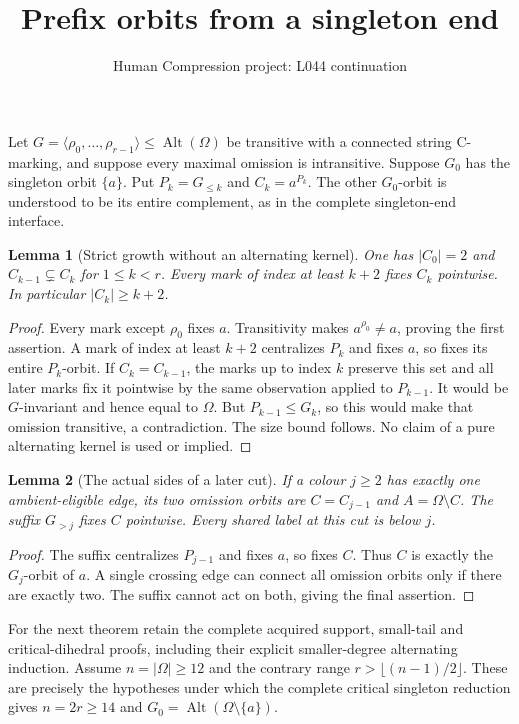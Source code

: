\documentclass[11pt,a4paper]{article}
\title{Prefix orbits from a singleton end}
\author{Human Compression project: L044 continuation}
\date{}
\newtheorem{lemma}{Lemma}
\newcommand{\gen}[1]{\langle#1\rangle}
\begin{document}
\maketitle
Let $G=\gen{\rho_0,\ldots,\rho_{r-1}}\le\operatorname{Alt}(\Omega)$
be transitive with a connected string C-marking, and suppose every
maximal omission is intransitive. Suppose $G_0$ has the singleton
orbit $\{a\}$. Put $P_k=G_{\le k}$ and $C_k=a^{P_k}$.
The other $G_0$-orbit is understood to be its entire complement,
as in the complete singleton-end interface.

\begin{lemma}[Strict growth without an alternating kernel]\label{growth}
One has $|C_0|=2$ and $C_{k-1}\subsetneq C_k$ for
$1\le k<r$. Every mark of index at least $k+2$ fixes
$C_k$ pointwise. In particular $|C_k|\ge k+2$.
\end{lemma}
\begin{proof}
Every mark except $\rho_0$ fixes $a$. Transitivity makes
$a^{\rho_0}\ne a$, proving the first assertion. A mark of
index at least $k+2$ centralizes $P_k$ and fixes $a$,
so fixes its entire $P_k$-orbit. If $C_k=C_{k-1}$,
the marks up to index $k$ preserve this set and all later
marks fix it pointwise by the same observation applied to
$P_{k-1}$. It would be $G$-invariant and hence equal to
$\Omega$. But $P_{k-1}\le G_k$, so this would make that
omission transitive, a contradiction. The size bound follows.
No claim of a pure alternating kernel is used or implied.
\end{proof}

\begin{lemma}[The actual sides of a later cut]\label{sides}
If a colour $j\ge2$ has exactly one ambient-eligible edge,
its two omission orbits are $C=C_{j-1}$ and
$A=\Omega\setminus C$. The suffix $G_{>j}$ fixes $C$
pointwise. Every shared label at this cut is below $j$.
\end{lemma}
\begin{proof}
The suffix centralizes $P_{j-1}$ and fixes $a$, so fixes
$C$. Thus $C$ is exactly the $G_j$-orbit of $a$.
A single crossing edge can connect all omission orbits only
if there are exactly two. The suffix cannot act on both,
giving the final assertion.
\end{proof}

For the next theorem retain the complete acquired support,
small-tail and critical-dihedral proofs, including their explicit
smaller-degree alternating induction. Assume $n=|\Omega|\ge12$
and the contrary range $r>\lfloor(n-1)/2\rfloor$.
These are precisely the hypotheses under which the complete
critical singleton reduction gives $n=2r\ge14$ and
$G_0=\operatorname{Alt}(\Omega\setminus\{a\})$.
\end{document}

